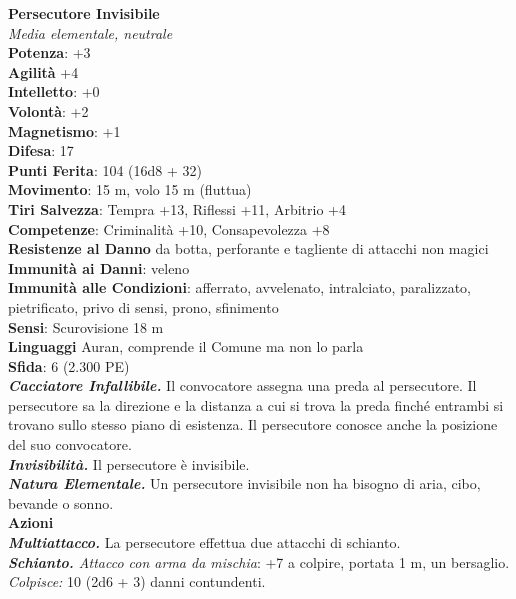 \begin{multicols}{2}
\medskip\textbf{Persecutore Invisibile}\\
\emph{Media elementale, neutrale}\\
\textbf{Potenza}: +3\\
\textbf{Agilità} +4\\
\textbf{Intelletto}: +0\\
\textbf{Volontà}: +2\\
\textbf{Magnetismo}: +1\\
\textbf{Difesa}: 17\\
\textbf{Punti Ferita}: 104 (16d8 + 32)\\
\textbf{Movimento}: 15 m, volo 15 m (fluttua)\\
\textbf{Tiri Salvezza}: Tempra +13, Riflessi +11, Arbitrio +4\\
\textbf{Competenze}: Criminalità +10, Consapevolezza +8\\
\textbf{Resistenze al Danno} da botta, perforante e tagliente di attacchi non magici\\
\textbf{Immunità ai Danni}: veleno\\
\textbf{Immunità alle Condizioni}: afferrato, avvelenato, intralciato, paralizzato, pietrificato, privo di sensi, prono, sfinimento\\
\textbf{Sensi}: Scurovisione 18 m\\
\textbf{Linguaggi} Auran, comprende il Comune ma non lo parla \\
\textbf{Sfida}: 6 (2.300 PE)\smallskip\\
\emph{\textbf{Cacciatore Infallibile.}} Il convocatore assegna una preda al persecutore. Il persecutore sa la direzione e la distanza a cui si trova la preda finché entrambi si trovano sullo stesso piano di esistenza. Il persecutore conosce anche la posizione del suo convocatore.\\
\emph{\textbf{Invisibilità.}} Il persecutore è invisibile.\\
\emph{\textbf{Natura Elementale.}} Un persecutore invisibile non ha bisogno di aria, cibo, bevande o sonno.\\
\smallskip\textbf{Azioni}\\
\emph{\textbf{Multiattacco.}} La persecutore effettua due attacchi di schianto.\\
\emph{\textbf{Schianto.} Attacco con arma da mischia}: +7 a colpire, portata 1 m, un bersaglio.\\
\emph{Colpisce:} 10 (2d6 + 3) danni contundenti.\\


\end{multicols}
